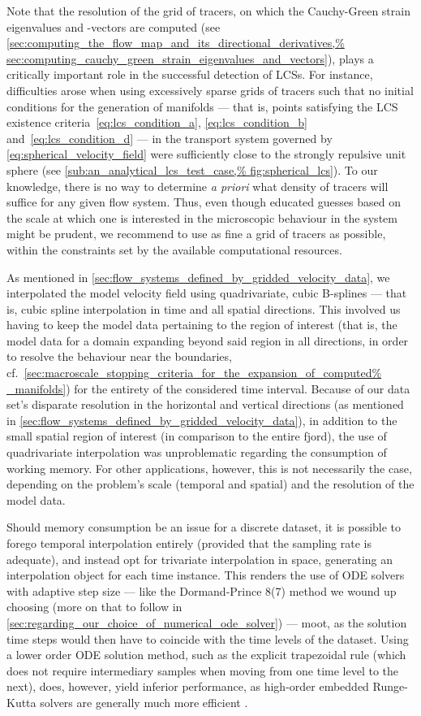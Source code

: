 Note that the resolution of the grid of tracers, on which the Cauchy-Green
strain eigenvalues and -vectors are computed (see
\cref{sec:computing_the_flow_map_and_its_directional_derivatives,%
sec:computing_cauchy_green_strain_eigenvalues_and_vectors}), plays a critically
important role in the successful detection of LCSs. For instance, difficulties
arose when using excessively sparse grids of tracers such that no initial
conditions for the generation of manifolds --- that is, points satisfying the
LCS existence criteria~\eqref{eq:lcs_condition_a}, \eqref{eq:lcs_condition_b}
and~\eqref{eq:lcs_condition_d} --- in the transport system governed by
\cref{eq:spherical_velocity_field} were sufficiently close to the strongly
repulsive unit sphere (see \cref{sub:an_analytical_lcs_test_case,%
fig:spherical_lcs}). To our knowledge, there is no way to determine
\emph{a priori} what density of tracers will suffice for any given flow system.
Thus, even though educated guesses based on the scale at which one is
interested in the microscopic behaviour in the system might be prudent, we
recommend to use as fine a grid of tracers as possible, within the constraints
set by the available computational resources.

As mentioned in \cref{sec:flow_systems_defined_by_gridded_velocity_data}, we
interpolated the model velocity field using quadrivariate, cubic B-splines ---
that is, cubic spline interpolation in time and all spatial directions. This
involved us having to keep the model data pertaining to the region of interest
(that is, the model data for a domain expanding beyond said region in all
directions, in order to resolve the behaviour near the boundaries, cf.\
\cref{sec:macroscale_stopping_criteria_for_the_expansion_of_computed%
_manifolds}) for the entirety of the considered time interval. Because of our
data set's disparate resolution in the horizontal and vertical directions
(as mentioned in \cref{sec:flow_systems_defined_by_gridded_velocity_data}), in
addition to the small spatial region of interest (in comparison to the entire
fjord), the use of quadrivariate interpolation was unproblematic regarding
the consumption of working memory. For other applications, however, this is not
necessarily the case, depending on the problem's scale (temporal and spatial)
and the resolution of the model data.

Should memory consumption be an issue for a discrete dataset, it is possible
to forego temporal interpolation entirely (provided that the sampling rate
is adequate), and instead opt for trivariate interpolation in space, generating
an interpolation object for each time instance. This renders the use of
ODE solvers with adaptive step size --- like the Dormand-Prince 8(7) method we
wound up choosing (more on that to follow in
\cref{sec:regarding_our_choice_of_numerical_ode_solver}) --- moot, as the
solution time steps would then have to coincide with the time levels of the
dataset. Using a lower order ODE solution method, such as the explicit
trapezoidal rule (which does not require intermediary samples when moving from
one time level to the next), does, however, yield inferior performance, as
high-order embedded Runge-Kutta solvers are generally much more efficient
\parencite{loken2017sensitivity}.



